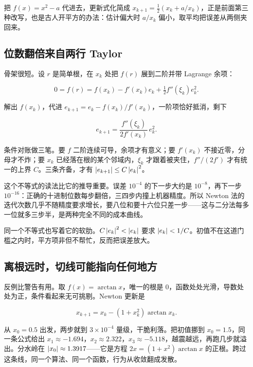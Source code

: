 把 \(f(x)=x^2-a\) 代进去，更新式化简成 \(x_{k+1}=\frac12(x_k+a/x_k)\)，正是前面第三种改写，也是古人开平方的办法：估计偏大时 \(a/x_k\) 偏小，取平均把误差从两侧夹回来。

\subsection{位数翻倍来自两行 Taylor}

骨架很短。设 \(r\) 是简单根，在 \(x_k\) 处把 \(f(r)\) 展到二阶并带 Lagrange 余项：

\[
0=f(r)=f(x_k)-f'(x_k)e_k+\tfrac12f''(\xi_k)e_k^2 .
\]

解出 \(f(x_k)\)，代进 \(e_{k+1}=e_k-f(x_k)/f'(x_k)\)，一阶项恰好抵消，剩下

\[
e_{k+1}=\frac{f''(\xi_k)}{2f'(x_k)}\,e_k^2 .
\]

条件对账做三笔。要 \(f\) 二阶连续可导，余项才有意义；要 \(f'(x_k)\) 不接近零，分母才不炸；要 \(x_k\) 已经落在根的某个邻域内，\(\xi_k\) 才跟着被夹住，\(f''/(2f')\) 才有统一的上界 \(C\)。三条齐备，才有 \(\left|e_{k+1}\right|\le C\left|e_k\right|^2\)。

这个不等式的读法比它的推导重要。误差 \(10^{-4}\) 的下一步大约是 \(10^{-8}\)，再下一步 \(10^{-16}\)：正确的十进制位数每步翻倍，三四步内撞上机器精度。所以 Newton 法的迭代次数几乎不随精度要求增长，要八位和要十六位只差一步——这与二分法每多一位就多三步半，是两种完全不同的成本曲线。

同一个不等式也写着它的软肋。\(C\left|e_k\right|^2<\left|e_k\right|\) 要求 \(\left|e_k\right|<1/C\)。初值不在这道门槛之内时，平方项非但不帮忙，反而把误差放大。

\subsection{离根远时，切线可能指向任何地方}

反例比警告有用。取 \(f(x)=\arctan x\)，唯一的根是 \(0\)，函数处处光滑，导数处处为正，条件看起来无可挑剔。Newton 更新是

\[
x_{k+1}=x_k-(1+x_k^2)\arctan x_k .
\]

从 \(x_0=0.5\) 出发，两步就到 \(3\times10^{-4}\) 量级，干脆利落。把初值挪到 \(x_0=1.5\)，同一条公式给出 \(x_1\approx-1.694\)，\(x_2\approx2.322\)，\(x_3\approx-5.118\)，越震越远，再跑几步就溢出。分水岭在 \(\left|x_0\right|\approx1.3917\)——它是方程 \(2x=(1+x^2)\arctan x\) 的正根。跨过这条线，同一个算法、同一个函数，行为从收敛翻成发散。

